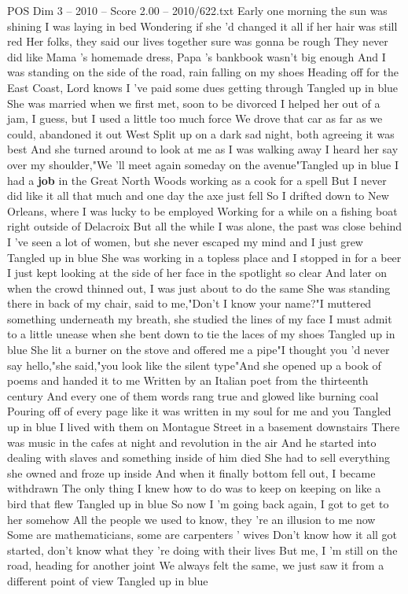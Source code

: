 \begin{textsample}{POS Dim 3 – 2010 – Score 2.00 – 2010/622.txt}  \label{ex:f3_pos_029}
Early one morning the sun was shining I was laying in bed Wondering if she 'd changed it all if her hair was still red Her folks, they said our lives together sure was gonna be rough They never did like Mama 's homemade dress, Papa 's bankbook wasn't big enough And I was standing on the side of the road, rain falling on my shoes Heading off for the East Coast, Lord knows I 've paid some dues getting through Tangled up in blue She was married when we first met, soon to be divorced I helped her out of a jam, I guess, but I used a little too much force We drove that car as far as we could, abandoned it out West Split up on a dark sad night, both agreeing it was best And she turned around to look at me as I was walking away I heard her say over my shoulder,"We 'll meet again someday on the avenue"Tangled up in blue I had a \textbf{job} in the Great North Woods working as a cook for a spell But I never did like it all that much and one day the axe just fell So I drifted down to New Orleans, where I was lucky to be employed Working for a while on a fishing boat right outside of Delacroix But all the while I was alone, the past was close behind I 've seen a lot of women, but she never escaped my mind and I just grew Tangled up in blue She was working in a topless place and I stopped in for a beer I just kept looking at the side of her face in the spotlight so clear And later on when the crowd thinned out, I was just about to do the same She was standing there in back of my chair, said to me,"Don't I know your name?"I muttered something underneath my breath, she studied the lines of my face I must admit to a little unease when she bent down to tie the laces of my shoes Tangled up in blue She lit a burner on the stove and offered me a pipe"I thought you 'd never say hello,"she said,"you look like the silent type"And she opened up a book of poems and handed it to me Written by an Italian poet from the thirteenth century And every one of them words rang true and glowed like burning coal Pouring off of every page like it was written in my soul for me and you Tangled up in blue I lived with them on Montague Street in a basement downstairs There was music in the cafes at night and revolution in the air And he started into dealing with slaves and something inside of him died She had to sell everything she owned and froze up inside And when it finally bottom fell out, I became withdrawn The only thing I knew how to do was to keep on keeping on like a bird that flew Tangled up in blue So now I 'm going back again, I got to get to her somehow All the people we used to know, they 're an illusion to me now Some are mathematicians, some are carpenters ' wives Don't know how it all got started, don't know what they 're doing with their lives But me, I 'm still on the road, heading for another joint We always felt the same, we just saw it from a different point of view Tangled up in blue

\end{textsample}
